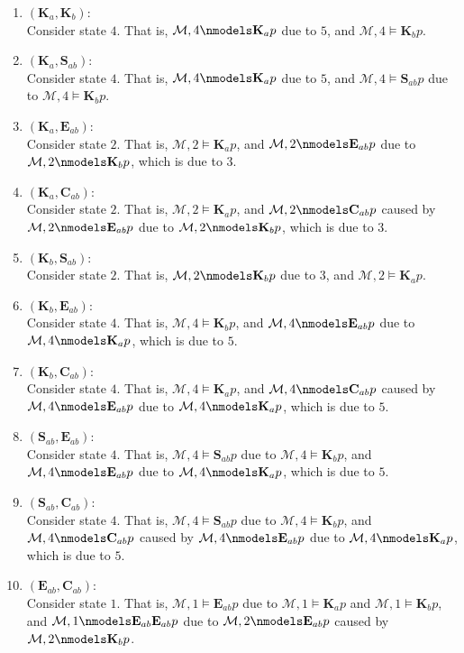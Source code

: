 \documentclass[11pt,a4paper]{article}
\newcommand{\eall}{\mathbf{K}}
\newcommand{\edisp}{\mathbf{S}}
\newcommand{\egen}{\mathbf{E}}
\newcommand{\ecom}{\mathbf{C}}
\begin{document}
\begin{enumerate}
\item $(\eall_a, \eall_b)$:\\
Consider state $4$. That is, $\mathcal{M},4 \nmodels \eall_a p$ due to $5$, and $\mathcal{M},4 \models \eall_b p$.
\item $(\eall_a, \edisp_{ab})$:\\
Consider state $4$. That is, $\mathcal{M},4 \nmodels \eall_a p$ due to $5$, and $\mathcal{M},4 \models \edisp_{ab} p$ due to $\mathcal{M},4 \models \eall_b p$.
\item $(\eall_a, \egen_{ab})$:\\
Consider state $2$. That is, $\mathcal{M},2 \models \eall_a p$, and $\mathcal{M},2 \nmodels \egen_{ab} p$ due to $\mathcal{M},2 \nmodels \eall_b p$, which is due to $3$.
\item $(\eall_a, \ecom_{ab})$:\\
Consider state $2$. That is, $\mathcal{M},2 \models \eall_a p$, and $\mathcal{M},2 \nmodels \ecom_{ab} p$ caused by $\mathcal{M},2 \nmodels \egen_{ab} p$ due to $\mathcal{M},2 \nmodels \eall_b p$, which is due to $3$.
\item $(\eall_b, \edisp_{ab})$:\\
Consider state $2$. That is, $\mathcal{M},2 \nmodels \eall_b p$ due to $3$, and $\mathcal{M},2 \models \eall_a p$.
\item $(\eall_b, \egen_{ab})$:\\
Consider state $4$. That is, $\mathcal{M},4 \models \eall_b p$, and $\mathcal{M},4 \nmodels \egen_{ab} p$ due to $\mathcal{M},4 \nmodels \eall_a p$, which is due to $5$.
\item $(\eall_b, \ecom_{ab})$:\\
Consider state $4$. That is, $\mathcal{M},4\models \eall_a p$, and $\mathcal{M},4 \nmodels \ecom_{ab} p$ caused by $\mathcal{M},4 \nmodels \egen_{ab} p$ due to $\mathcal{M},4 \nmodels \eall_a p$, which is due to $5$.


\item $(\edisp_{ab}, \egen_{ab})$:\\
Consider state $4$. That is, $\mathcal{M},4 \models \edisp_{ab} p$ due to $\mathcal{M},4 \models \eall_b p$, and $\mathcal{M},4 \nmodels \egen_{ab} p$ due to $\mathcal{M},4 \nmodels \eall_a p$, which is due to $5$.
\item $(\edisp_{ab}, \ecom_{ab})$:\\
Consider state $4$. That is, $\mathcal{M},4 \models \edisp_{ab} p$ due to $\mathcal{M},4 \models \eall_b p$, and $\mathcal{M},4 \nmodels \ecom_{ab} p$ caused by $\mathcal{M},4 \nmodels \egen_{ab} p$ due to $\mathcal{M},4 \nmodels \eall_a p$, which is due to $5$.

\item $(\egen_{ab}, \ecom_{ab})$:\\
Consider state $1$. That is, $\mathcal{M},1 \models \egen_{ab} p$ due to $\mathcal{M},1 \models \eall_a p$ and $\mathcal{M},1 \models \eall_b p$, and $\mathcal{M},1 \nmodels  \egen_{ab} \egen_{ab} p$ due to $\mathcal{M},2 \nmodels  \egen_{ab} p$ caused by $\mathcal{M},2 \nmodels  \eall_b p$.
\end{enumerate}
\end{document}
